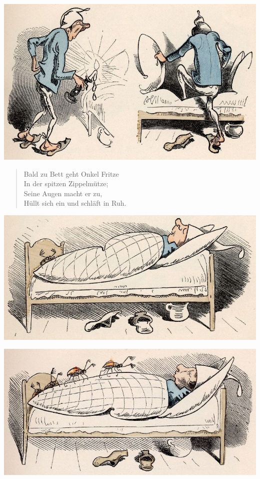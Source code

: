 \documentclass[a4paper,12pt]{article}
\begin{document}
\begin{center}\includegraphics[scale=.7, alt={Onkel Fritze geht zu Bette}]{images/5-05.jpg}\end{center}



\begin{verse}
Bald zu Bett geht Onkel Fritze\\{}
In der spitzen Zippelmütze;\\{}
Seine Augen macht er zu,\\{}
Hüllt sich ein und schläft in Ruh.
\end{verse}



\begin{center}\includegraphics[scale=.7, alt={... und schläft in Ruh}]{images/5-06.jpg}\end{center}




\begin{center}\includegraphics[scale=.7, alt={Die Käfer}]{images/5-07.jpg}\end{center}
\end{document}
